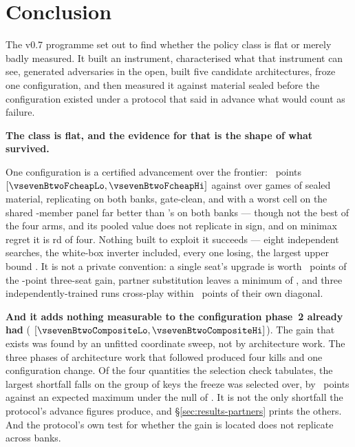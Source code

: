\section{Conclusion}
\label{sec:conclusion}

The v0.7 programme set out to find whether the \vsix{} policy class is flat or merely badly measured.
It built an instrument, characterised what that instrument can see, generated adversaries in the open,
built five candidate architectures, froze one configuration, and then measured it against material
sealed before the configuration existed under a protocol that said in advance what would count as
failure.

\textbf{The class is flat, and the evidence for that is the shape of what survived.}

One configuration is a certified advancement over the \vsix{} frontier:
\vsevenBtwoFcheap{}~points $[\vsevenBtwoFcheapLo, \vsevenBtwoFcheapHi]$ against \fcheap{} over
\vsevenBtwoFcheapN{} games of sealed material, replicating on both banks, gate-clean, and with a worst cell on the shared \vsevenPanelMembers{}-member panel far better than
\incumbent{}'s \vsevenWorstIncumbent{} on both banks --- though not the best of the four arms, and
its pooled value does not replicate in sign, and on minimax regret it is
\vsevenRegretFrozenRank{}rd of four. Nothing built to exploit it
succeeds --- eight independent searches, the white-box inverter included, every one losing, the largest
upper bound \vsevenBfourWorstUpper{}. It is not a private convention: a single seat's upgrade is worth
\vsevenOneSeatFive{}~points of the \vsevenSoneSelf{}-point three-seat gain, partner substitution
leaves a minimum of \vsevenSoneMin{}, and three independently-trained runs cross-play within
\vsevenXpGapAbs{}~points of their own diagonal.

\textbf{And it adds nothing measurable to the configuration phase~2 already had}
(\vsevenBtwoComposite{} $[\vsevenBtwoCompositeLo, \vsevenBtwoCompositeHi]$). The gain that exists was
found by an unfitted coordinate sweep, not by architecture work. The three phases of architecture work
that followed produced four kills and one configuration change. Of the four quantities the selection check tabulates, the largest shortfall falls on the group of
keys the freeze was selected over, by \vsevenSelWorstShortfall{}~points against an expected maximum
under the null of \vsevenSelExpectedMax{}. It is not the only shortfall the protocol's advance
figures produce, and \S\ref{sec:results-partners} prints the others. And the protocol's own test for whether the gain is located does not replicate
across banks.

